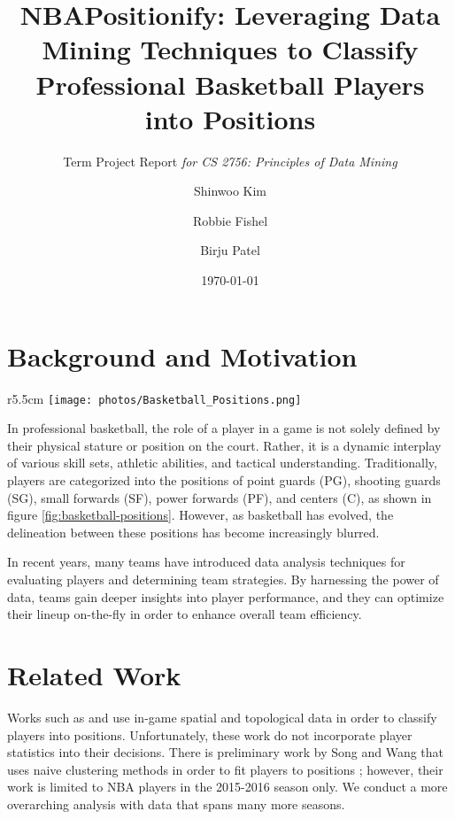 \documentclass[nonacm]{acmart}
\title{NBAPositionify: Leveraging Data Mining Techniques to Classify Professional Basketball Players into Positions}
\subtitle{Term Project Report \textit{for CS 2756: Principles of Data Mining}}
\author{Shinwoo Kim}
\author{Robbie Fishel}
\author{Birju Patel}
\date{\today}
\begin{document}
\maketitle
\section{Background and Motivation}
\begin{wrapfigure}{r}{5.5cm}
    \centering
    \texttt{[image: photos/Basketball\_Positions.png]}
    \caption{Basketball positions with the numbers as they are known: (1) Point Guard, (2) Shooting Guard, (3) Small Forward, (4) Power Forward, and (5) Center. Illustration from \href{https://en.wikipedia.org/wiki/Basketball_positions}{Wikipedia}.}
    \label{fig:basketball-positions}
\end{wrapfigure}
In professional basketball, the role of a player in a game is not solely defined by their physical stature or position on the court. Rather, it is a dynamic interplay of various skill sets, athletic abilities, and tactical understanding. Traditionally, players are categorized into the positions of point guards (PG), shooting guards (SG), small forwards (SF), power forwards (PF), and centers (C), as shown in figure \ref{fig:basketball-positions}. However, as basketball has evolved, the delineation between these positions has become increasingly blurred.

In recent years, many teams have introduced data analysis techniques for evaluating players and determining team strategies. By harnessing the power of data, teams gain deeper insights into player performance, and they can optimize their lineup on-the-fly in order to enhance overall team efficiency.



\section{Related Work}
Works such as \cite{from_5} and \cite{shea_2014} use in-game spatial and topological data in order to classify players into positions. Unfortunately, these work do not incorporate player statistics into their decisions. There is preliminary work by Song and Wang that uses naive clustering methods in order to fit players to positions \cite{song_wang_2017}; however, their work is limited to NBA players in the 2015-2016 season only. We conduct a more overarching analysis with data that spans many more seasons.
\end{document}
